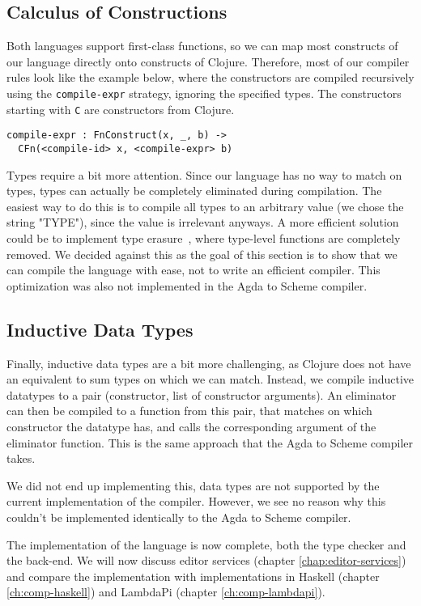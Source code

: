 \subsection{Calculus of Constructions}
Both languages support first-class functions, so we can map most constructs of our language directly onto constructs of Clojure. Therefore, most of our compiler rules look like the example below, where the constructors are compiled recursively using the \verb|compile-expr| strategy, ignoring the specified types. The constructors starting with \verb|C| are constructors from Clojure. 
\begin{lstlisting}
compile-expr : FnConstruct(x, _, b) -> 
  CFn(<compile-id> x, <compile-expr> b)
\end{lstlisting}

Types require a bit more attention. Since our language has no way to match on types, types can actually be completely eliminated during compilation. The easiest way to do this is to compile all types to an arbitrary value (we chose the string "TYPE"), since the value is irrelevant anyways. A more efficient solution could be to implement type erasure~\cite[Section 23.6]{tapl}, where type-level functions are completely removed. We decided against this as the goal of this section is to show that we can compile the language with ease, not to write an efficient compiler. This optimization was also not implemented in the Agda to Scheme compiler.

\subsection{Inductive Data Types}

Finally, inductive data types are a bit more challenging, as Clojure does not have an equivalent to sum types on which we can match. Instead, we compile inductive datatypes to a pair (constructor, list of constructor arguments). An eliminator can then be compiled to a function from this pair, that matches on which constructor the datatype has, and calls the corresponding argument of the eliminator function. This is the same approach that the Agda to Scheme compiler takes. 

We did not end up implementing this, data types are not supported by the current implementation of the compiler. However, we see no reason why this couldn't be implemented identically to the Agda to Scheme compiler.

The implementation of the language is now complete, both the type checker and the back-end. We will now discuss editor services (chapter \ref{chap:editor-services}) and compare the implementation with implementations in Haskell (chapter \ref{ch:comp-haskell}) and LambdaPi (chapter \ref{ch:comp-lambdapi}).